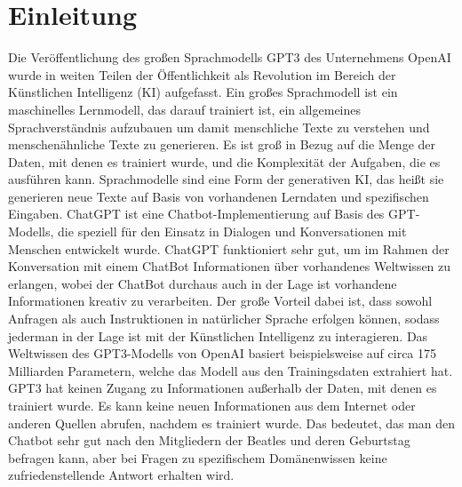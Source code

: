 \section{Einleitung}
\label{sec:introduction}
Die Veröffentlichung des großen Sprachmodells GPT3 des Unternehmens OpenAI wurde in weiten Teilen der Öffentlichkeit als Revolution im Bereich der Künstlichen Intelligenz (KI) aufgefasst. Ein großes Sprachmodell ist ein maschinelles Lernmodell, das darauf trainiert ist, ein allgemeines Sprachverständnis aufzubauen um damit menschliche Texte zu verstehen und menschenähnliche Texte zu generieren. Es ist groß in Bezug auf die Menge der Daten, mit denen es trainiert wurde, und die Komplexität der Aufgaben, die es ausführen kann. Sprachmodelle sind eine Form der generativen KI, das heißt sie generieren neue Texte auf Basis von vorhandenen Lerndaten und spezifischen Eingaben. ChatGPT ist eine Chatbot-Implementierung auf Basis des GPT-Modells, die speziell für den Einsatz in Dialogen und Konversationen mit Menschen entwickelt wurde. ChatGPT funktioniert sehr gut, um im Rahmen der Konversation mit einem ChatBot Informationen über vorhandenes Weltwissen zu erlangen, wobei der ChatBot durchaus auch in der Lage ist vorhandene Informationen kreativ zu verarbeiten. Der große Vorteil dabei ist, dass sowohl Anfragen als auch Instruktionen in natürlicher Sprache erfolgen können, sodass jederman in der Lage ist mit der Künstlichen Intelligenz zu interagieren. Das Weltwissen des GPT3-Modells von OpenAI basiert beispielsweise auf circa 175 Milliarden Parametern, welche das Modell aus den Trainingsdaten extrahiert hat. GPT3 hat keinen Zugang zu Informationen außerhalb der Daten, mit denen es trainiert wurde. Es kann keine neuen Informationen aus dem Internet oder anderen Quellen abrufen, nachdem es trainiert wurde. Das bedeutet, das man den Chatbot sehr gut nach den Mitgliedern der Beatles und deren Geburtstag befragen kann, aber bei Fragen zu spezifischem Domänenwissen keine zufriedenstellende Antwort erhalten wird. \parencite{noauthor_chatgpt_2023} \\

